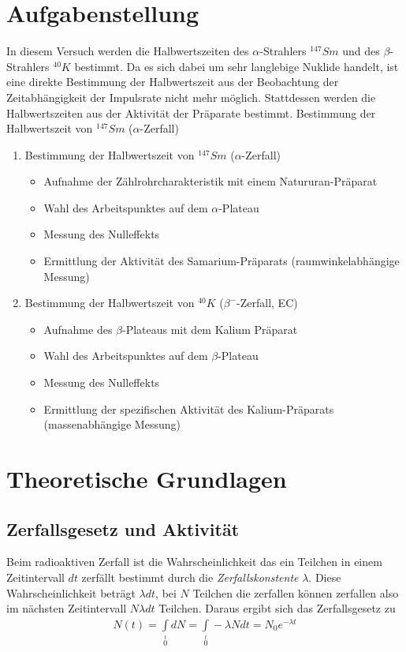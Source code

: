 \documentclass[12pt]{article}
\begin{document}
\section{Aufgabenstellung}
In diesem Versuch werden die Halbwertszeiten des $\alpha$-Strahlers $^{147}Sm$ und des $\beta$-Strahlers $^{40}K$ bestimmt. Da es sich dabei um sehr langlebige Nuklide handelt, ist eine direkte Bestimmung der Halbwertszeit aus der Beobachtung der Zeitabhängigkeit der Impulsrate nicht mehr möglich. Stattdessen werden die Halbwertszeiten aus der Aktivität der Präparate bestimmt. Bestimmung der Halbwertszeit von $^{147}Sm$ ($\alpha$-Zerfall)
\begin{enumerate}
 \item Bestimmung der Halbwertszeit von $^{147}Sm$ ($\alpha$-Zerfall)
\begin{itemize}
 \item Aufnahme der Zählrohrcharakteristik mit einem Natururan-Präparat
 \item Wahl des Arbeitspunktes auf dem $\alpha$-Plateau
 \item Messung des Nulleffekts
 \item Ermittlung der Aktivität des Samarium-Präparats (raumwinkelabhängige Messung)
\end{itemize}
\item Bestimmung der Halbwertszeit von $^{40}K$ ($\beta ^-$-Zerfall, EC)
\begin{itemize}
\item Aufnahme des $\beta$-Plateaus mit dem Kalium Präparat
\item Wahl des Arbeitspunktes auf dem $\beta$-Plateau
\item Messung des Nulleffekts
\item Ermittlung der spezifischen Aktivität des Kalium-Präparats (massenabhängige Messung)
\end{itemize}
\end{enumerate}

\section{Theoretische Grundlagen}
\subsection{Zerfallsgesetz und Aktivität}
Beim radioaktiven Zerfall ist die Wahrscheinlichkeit das ein Teilchen in einem Zeitintervall $dt$ zerfällt bestimmt durch die \textit{Zerfallskonstente} $\lambda$. Diese Wahrscheinlichkeit beträgt $\lambda dt$, bei $N$ Teilchen die zerfallen können zerfallen also im nächsten Zeitintervall $N\lambda dt$ Teilchen. Daraus ergibt sich das Zerfallsgesetz zu
\begin{align}
 N(t) = \int \limits_{0} \limits^{t} dN = \int \limits_{0} \limits^{t} - \lambda N dt = N_0 e^{-\lambda t}
\end{align}
\end{document}

